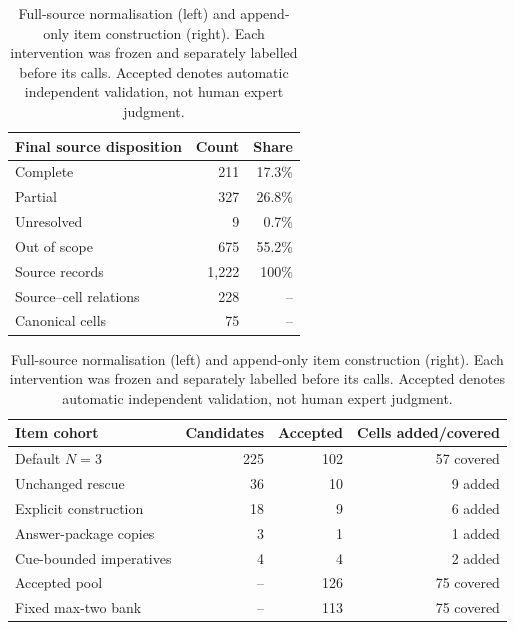 \begin{table}[t]
  \centering
  \footnotesize
  \setlength{\tabcolsep}{3pt}
  \begin{minipage}[t]{.39\textwidth}
    \centering
    \begin{tabular}{@{}lrr@{}}
      \toprule
      Final source disposition & Count & Share \\
      \midrule
      Complete & 211 & 17.3\% \\
      Partial & 327 & 26.8\% \\
      Unresolved & 9 & 0.7\% \\
      Out of scope & 675 & 55.2\% \\
      \midrule
      Source records & 1,222 & 100\% \\
      Source--cell relations & 228 & -- \\
      Canonical cells & 75 & -- \\
      \bottomrule
    \end{tabular}
  \end{minipage}\hfill
  \begin{minipage}[t]{.58\textwidth}
    \centering
    \begin{tabular}{@{}lrrr@{}}
      \toprule
      Item cohort & Candidates & Accepted & Cells added/covered \\
      \midrule
      Default $N=3$ & 225 & 102 & 57 covered \\
      Unchanged rescue & 36 & 10 & 9 added \\
      Explicit construction & 18 & 9 & 6 added \\
      Answer-package copies & 3 & 1 & 1 added \\
      Cue-bounded imperatives & 4 & 4 & 2 added \\
      \midrule
      Accepted pool & -- & 126 & 75 covered \\
      Fixed max-two bank & -- & 113 & 75 covered \\
      \bottomrule
    \end{tabular}
  \end{minipage}
  \caption{Full-source normalisation (left) and append-only item construction
  (right).  Each intervention was frozen and separately labelled before its
  calls.  Accepted denotes automatic independent validation, not human
  expert judgment.}
  \label{tab:normalization-results}
\end{table}
